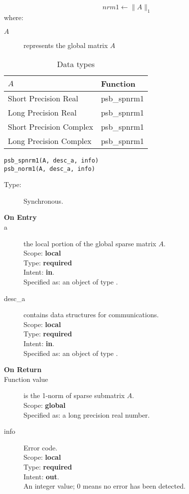 \[ nrm1 \leftarrow \|A\|_1 \]
where:
\begin{description}
\item[$A$] represents the global matrix $A$
\end{description}

\begin{table}[h]
\begin{center}
\begin{tabular}{ll}
\hline
$A$ & {\bf Function}\\
\hline
Short Precision Real & psb\_spnrm1 \\
Long Precision Real & psb\_spnrm1 \\
Short Precision Complex & psb\_spnrm1 \\
Long Precision Complex & psb\_spnrm1 \\
\hline
\end{tabular}
\end{center}
\caption{Data types\label{tab:f90nrm1}}
\end{table}

\begin{verbatim}
psb_spnrm1(A, desc_a, info)
psb_norm1(A, desc_a, info)
\end{verbatim}

\begin{description}
\item[Type:] Synchronous.
\item[\bf On Entry]
\item[a] the local  portion of the global sparse matrix
$A$. \\   
Scope: {\bf local} \\
Type: {\bf required}\\
Intent: {\bf in}.\\
Specified as: an object of type \spdata.
\item[desc\_a] contains data structures for communications.\\
Scope: {\bf local} \\
Type: {\bf required}\\
Intent: {\bf in}.\\
Specified as: an object of type \descdata.
\item[\bf On Return] 
\item[Function value] is the 1-norm of sparse submatrix $A$.\\
Scope: {\bf global} \\
Specified as: a long precision real number.
\item[info] Error code.\\
Scope: {\bf local} \\
Type: {\bf required} \\
Intent: {\bf out}.\\
An integer value; 0 means no error has been detected. 
\end{description}


